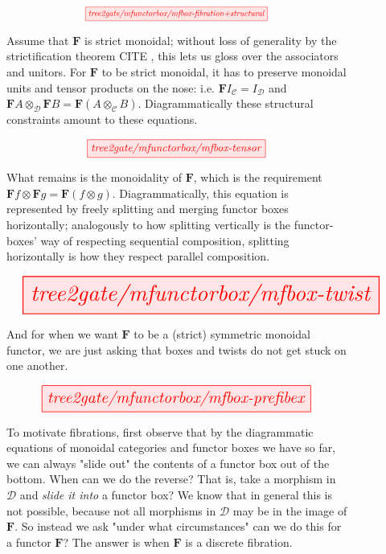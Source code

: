 \begin{figure}[h!]
\[\resizebox{0.5\textwidth}{!}{\tikzfig{tree2gate/mfunctorbox/mfbox-fibration+structural}}\]
\caption{Assume that $\mathbf{F}$ is strict monoidal; without loss of generality by the strictification theorem \bR CITE \e, this lets us gloss over the associators and unitors. For $\mathbf{F}$ to be strict monoidal, it has to preserve monoidal units and tensor products on the nose: i.e. $\mathbf{F}I_\mathcal{C} = I_\mathcal{D}$ and $\mathbf{F}A \otimes_\mathcal{D} \mathbf{F}B = \mathbf{F}(A \otimes_\mathcal{C} B)$. Diagrammatically these structural constraints amount to these equations.}
\end{figure}

\begin{figure}[h!]
\[\resizebox{0.5\textwidth}{!}{\tikzfig{tree2gate/mfunctorbox/mfbox-tensor}}\]
\caption{What remains is the monoidality of $\mathbf{F}$, which is the requirement $\mathbf{F}f \otimes \mathbf{F}g = \mathbf{F}(f \otimes g)$. Diagrammatically, this equation is represented by freely splitting and merging functor boxes horizontally; analogously to how splitting vertically is the functor-boxes' way of respecting sequential composition, splitting horizontally is how they respect parallel composition.}
\end{figure}

\begin{figure}[h!]
\[\resizebox{\textwidth}{!}{\tikzfig{tree2gate/mfunctorbox/mfbox-twist}}\]
\caption{And for when we want $\mathbf{F}$ to be a (strict) symmetric monoidal functor, we are just asking that boxes and twists do not get stuck on one another.}
\end{figure}

\begin{figure}[h!]
\[\resizebox{0.75\textwidth}{!}{\tikzfig{tree2gate/mfunctorbox/mfbox-prefibex}}\]
\caption{To motivate fibrations, first observe that by the diagrammatic equations of monoidal categories and functor boxes we have so far, we can always "slide out" the contents of a functor box out of the bottom. When can we do the reverse? That is, take a morphism in $\mathcal{D}$ and \emph{slide it into} a functor box? We know that in general this is not possible, because not all morphisms in $\mathcal{D}$ may be in the image of $\mathbf{F}$. So instead we ask "under what circumstances" can we do this for a functor $\mathbf{F}$? The answer is when $\mathbf{F}$ is a discrete fibration.}
\end{figure}

